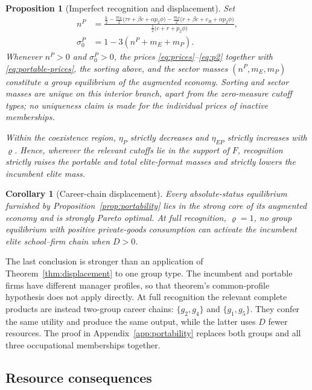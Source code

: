 \documentclass[12pt,letterpaper]{article}
\newtheorem{proposition}{Proposition}
\newtheorem{corollary}{Corollary}
\theoremstyle{definition}
\begin{document}
\begin{proposition}[Imperfect recognition and displacement]
Set
\begin{equation}\label{eq:portable-clearing}
\begin{aligned}
  n^P
  &=
  \frac{
  \frac{k}{2}
  -\frac{m_E}{2}\big(\tau r+\beta c+\alpha p_2\phi\big)
  -\frac{m_P}{2}\big(r+\beta c+c_R+\alpha p_2\phi\big)}
  {\frac12\big(c+r+p_2\phi\big)},\\
  \sigma_0^P
  &=1-3(n^P+m_E+m_P).
\end{aligned}
\end{equation}
Whenever $n^P>0$ and $\sigma_0^P>0$, the prices
\eqref{eq:prices}--\eqref{eq:p2} together with \eqref{eq:portable-prices}, the sorting
above, and the sector masses $(n^P,m_E,m_P)$ constitute a group equilibrium of the
augmented economy.
Sorting and sector masses are unique on this interior branch, apart from the
zero-measure cutoff types; no uniqueness claim is made for the individual prices of
inactive memberships.

Within the coexistence region, $\eta_P$ strictly decreases and $\eta_{EP}$ strictly
increases with $\varrho$.
Hence, wherever the relevant cutoffs lie in the support of $F$, recognition strictly
raises the portable and total elite-format masses and strictly lowers the incumbent
elite mass.
\end{proposition}

\begin{corollary}[Career-chain displacement]\label{cor:chain-displacement}
Every absolute-status equilibrium furnished by Proposition~\ref{prop:portability} lies
in the strong core of its augmented economy and is strongly Pareto optimal.
At full recognition, $\varrho=1$, no group equilibrium with positive private-goods
consumption can activate the incumbent elite school--firm chain when $D>0$.
\end{corollary}

The last conclusion is stronger than an application of
Theorem~\ref{thm:displacement} to one group type.
The incumbent and portable firms have different manager profiles, so that theorem's
common-profile hypothesis does not apply directly.
At full recognition the relevant complete products are instead two-group career chains:
$\{g_2,g_4\}$ and $\{g_1,g_5\}$.
They confer the same utility and produce the same output, while the latter uses $D$
fewer resources.
The proof in Appendix~\ref{app:portability} replaces both groups and all three
occupational memberships together.

\subsection{Resource consequences}
\end{document}
